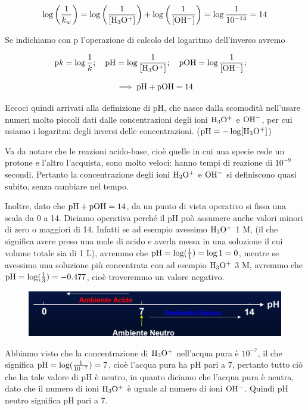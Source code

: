 $$\log \left( \frac{1}{k_w} \right) = \log \left( \frac{1}{\rm{[H_3O^+]}} \right) + \log \left( \frac{1}{\rm{[OH^-]}} \right) = \log \frac{1}{10^{-14}}=14$$

Se indichiamo con p l'operazione di calcolo del logaritmo dell'inverso avremo

$$\text{p}k = \log \frac{1}{k}; \quad \rm pH = \log \frac{1}{[H_3O^+]}; \quad pOH = \log \frac{1}{[OH^-]}; \quad$$

$$\implies \rm pH + pOH = 14$$

Eccoci quindi arrivati alla definizione di pH, che nasce dalla scomodità nell'usare numeri molto piccoli dati dalle concentrazioni degli ioni $\rm H_3O^+$ e $\rm OH^-$, per cui usiamo i logaritmi degli inversi delle concentrazioni. ($\rm pH=-\log[H_3O^+]$)

Va da notare che le reazioni acido-base, cioè quelle in cui una specie cede un protone e l'altro l'acquista, sono molto veloci: hanno tempi di reazione di $10^{-9}$ secondi. Pertanto la concentrazione degli ioni $\rm H_3O^+$ e $\rm OH^-$ si definiscono quasi subito, senza cambiare nel tempo.

\vspace{0.2cm}Inoltre, dato che $\rm pH + pOH = 14$, da un punto di vista operativo si fissa una scala da 0 a 14. Diciamo operativa perché il pH può assumere anche valori minori di zero o maggiori di 14. Infatti se ad esempio avessimo $\rm H_3O^+$ 1 M, (il che significa avere preso una mole di acido e averla messa in una soluzione il cui volume totale sia di 1 L), avremmo che $\rm pH=\log(\frac{1}{1})=\log{1}=0$, mentre se avessimo una soluzione più concentrata con ad esempio $\rm H_3O^+$ 3 M, avremmo che $\rm pH=\log(\frac{1}{3})=-0.477$, cioè troveremmo un valore negativo.

\begin{figure}[H]
    \centering
    \includegraphics[width=12cm]{immagini/scala_pH.png}
\end{figure}

Abbiamo visto che la concentrazione di $\rm H_3O^+$ nell'acqua pura è $10^{-7}$, il che significa $\rm pH=\log(\frac{1}{10^{-7}})=7$, cioè l'acqua pura ha pH pari a 7, pertanto tutto ciò che ha tale valore di pH è neutro, in quanto diciamo che l'acqua pura è neutra, dato che il numero di ioni $\rm H_3O^+$ è uguale al numero di ioni $\rm OH^-$. Quindi pH neutro significa pH pari a 7.

